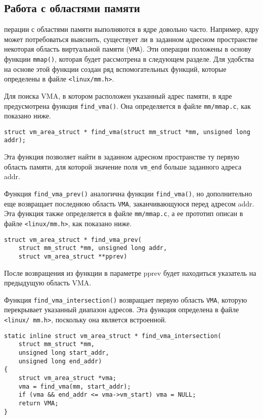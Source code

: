 \documentclass[12pt]{article}
\begin{document}
\pagebreak
\subsection*{Работа с областями памяти}

перации с областями памяти выполняются в ядре довольно часто. 
Например, ядру может потребоваться выяснить, существует ли в заданном адресном пространстве 
некоторая область виртуальной памяти (\verb!VMA!). Эти операции положены в основу функции \verb!mmap()!,
которая будет рассмотрена в следующем разделе. Для удобства на основе этой функции создан 
ряд вспомогательных функций, которые определены в файле \verb!<linux/mm.h>!.

Для поиска VMA, в котором расположен указанный адрес памяти, в ядре предусмотрена функция \verb!find_vma()!. 
Она определяется в файле \verb!mm/mmap.c!, как показано ниже.
\begin{lstlisting}
struct vm_area_struct * find_vma(struct mm_struct *mm, unsigned long addr);  
\end{lstlisting}

Эта функция позволяет найти в заданном адресном пространстве ту первую область памяти, 
для которой значение поля \verb!vm_end! больше заданного адреса addr.

Функция \verb!find_vma_prev()! аналогична функции \verb!find_vma()!, 
но дополнительно еще возвращает последнюю область \verb!VMA!, заканчивающуюся перед адресом addr. 
Эта функция также определяется в файле \verb!mm/mmap.c!, а ее прототип описан в файле \verb!<linux/mm.h>!, как показано ниже.

\begin{lstlisting}
struct vm_area_struct * find_vma_prev(
    struct mm_struct *mm, unsigned long addr,
    struct vm_area_struct **pprev)
\end{lstlisting}

После возвращения из функции в параметре pprev будет находиться указатель на
предыдущую область VMA.


Функция \verb!find_vma_intersection()! возвращает первую область \verb!VMA!, 
которую перекрывает указанный диапазон адресов. 
Эта функция определена в файле \verb!<linux/ mm.h>!, поскольку она является встроенной.

\begin{lstlisting}
static inline struct vm_area_struct * find_vma_intersection(
    struct mm_struct *mm,
    unsigned long start_addr,
    unsigned long end_addr)
{
    struct vm_area_struct *vma;
    vma = find_vma(mm, start_addr);
    if (vma && end_addr <= vma->vm_start) vma = NULL;
    return VMA;
}
\end{lstlisting}
\end{document}

